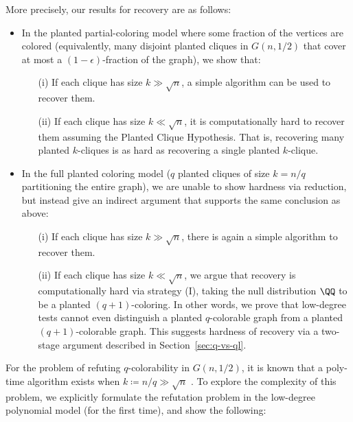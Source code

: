\documentclass{article}
\begin{document}
More precisely, our results for recovery are as follows:
\begin{itemize}
    \item In the planted partial-coloring model where some fraction of the vertices are colored (equivalently, many disjoint planted cliques in $G(n,1/2)$ that cover at most a $(1-\epsilon)$-fraction of the graph), we show that:
    \begin{itemize}
    \item[(i)] If each clique has size $k \gg \sqrt{n}$, a simple algorithm can be used to recover them.
    \item[(ii)] If each clique has size $k \ll \sqrt{n}$, it is computationally hard to recover them assuming the Planted Clique Hypothesis. That is, recovering many planted $k$-cliques is as hard as recovering a single planted $k$-clique.
    \end{itemize}
    \item In the full planted coloring model ($q$ planted cliques of size $k = n/q$ partitioning the entire graph), we are unable to show hardness via reduction, but instead give an indirect argument that supports the same conclusion as above:
    \begin{itemize}
    \item[(i)] If each clique has size $k \gg \sqrt{n}$, there is again a simple algorithm to recover them.
    \item[(ii)] If each clique has size $k \ll \sqrt{n}$, we argue that recovery is computationally hard via strategy (I), taking the null distribution $\QQ$ to be a planted $(q+1)$-coloring. In other words, we prove that low-degree tests cannot even distinguish a planted $q$-colorable graph from a planted $(q+1)$-colorable graph. This suggests hardness of recovery via a two-stage argument described in Section~\ref{sec:q-vs-ql}.
    \end{itemize}
\end{itemize}

 For the problem of refuting $q$-colorability in $G(n,1/2)$, it is known that a poly-time algorithm exists when $k \coloneqq n/q \gg \sqrt{n}$ \cite{lovasztheta}. To explore the complexity of this problem, we explicitly formulate the refutation problem in the low-degree polynomial model (for the first time), and show the following:
\end{document}
